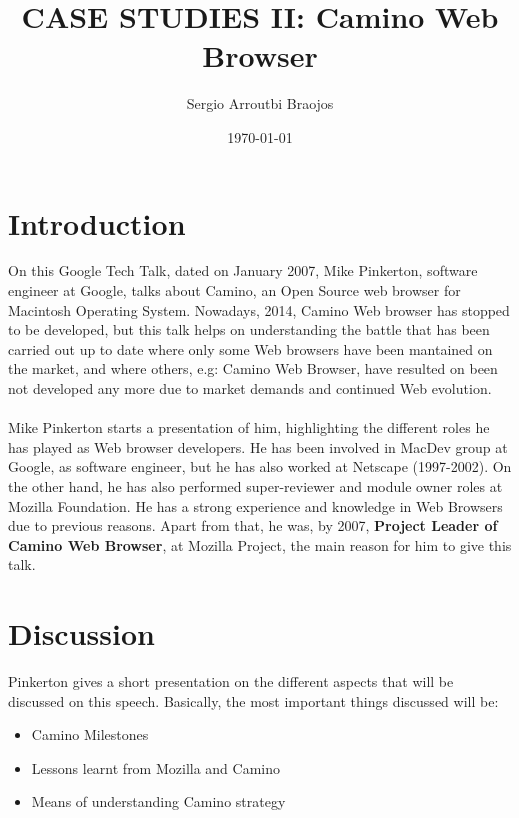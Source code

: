 \documentclass[11pt]{article}
\title{\textbf{CASE STUDIES II: Camino Web Browser}}
\author{Sergio Arroutbi Braojos}
\date{\today}
\begin{document}
\maketitle

\section{Introduction}
On this Google Tech Talk, dated on January 2007, Mike Pinkerton, software engineer at Google, talks about Camino, an Open Source web browser for Macintosh Operating System. Nowadays, 2014, Camino Web browser has stopped to be developed, but this talk helps on understanding the battle that has been carried out up to date where only some Web browsers have been mantained on the market, and where others, e.g: Camino Web Browser, have resulted on been not developed any more due to market demands and continued Web evolution.\\
\\
Mike Pinkerton starts a presentation of him, highlighting the different roles he has played as Web browser developers. He has been involved in MacDev group at Google, as software engineer, but he has also worked at Netscape (1997-2002). On the other hand, he has also performed super-reviewer and module owner roles at Mozilla Foundation. He has a strong experience and knowledge in Web Browsers due to previous reasons. Apart from that, he was, by 2007, \textbf{Project Leader of Camino Web Browser}, at Mozilla Project, the main reason for him to give this talk.
\section{Discussion}
Pinkerton gives a short presentation on the different aspects that will be discussed on this speech. Basically, the most important things discussed will be:
\begin{itemize}\itemsep0pt
\item{Camino Milestones}
\item{Lessons learnt from Mozilla and Camino}
\item{Means of understanding Camino strategy}
\end{itemize}
\end{document}
